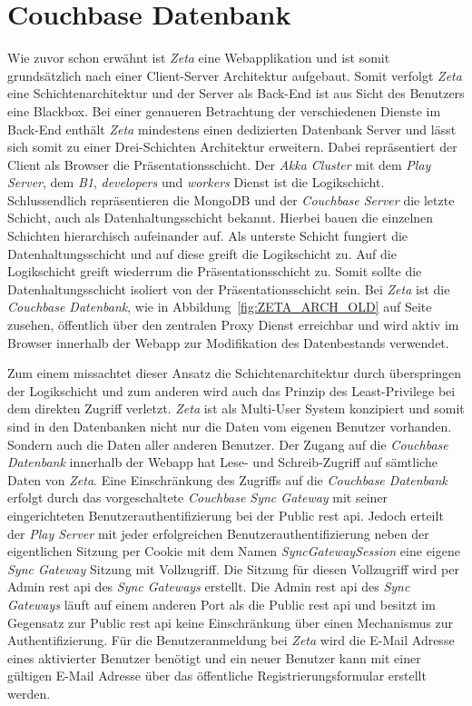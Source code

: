 \section{Couchbase Datenbank}

Wie zuvor schon erwähnt ist \textit{Zeta} eine Webapplikation und ist somit grundsätzlich nach einer Client-Server Architektur aufgebaut. Somit verfolgt \textit{Zeta} eine Schichtenarchitektur und der Server als Back-End ist aus Sicht des Benutzers eine Blackbox. Bei einer genaueren Betrachtung der verschiedenen Dienste im Back-End enthält \textit{Zeta} mindestens einen dedizierten Datenbank Server und lässt sich somit zu einer Drei-Schichten Architektur erweitern. Dabei repräsentiert der Client als Browser die Präsentationsschicht. Der \textit{Akka Cluster} mit dem \textit{Play Server}, dem \textit{B1}, \textit{developers} und \textit{workers} Dienst ist die Logikschicht. Schlussendlich repräsentieren die MongoDB und der \textit{Couchbase Server} die letzte Schicht, auch als Datenhaltungsschicht bekannt. Hierbei bauen die einzelnen Schichten hierarchisch aufeinander auf. Als unterste Schicht fungiert die Datenhaltungsschicht und auf diese greift die Logikschicht zu. Auf die Logikschicht greift wiederrum die Präsentationsschicht zu. Somit sollte die Datenhaltungsschicht isoliert von der Präsentationsschicht sein. Bei \textit{Zeta} ist die \textit{Couchbase Datenbank}, wie in Abbildung~\ref{fig:ZETA_ARCH_OLD} auf Seite~\pageref{fig:ZETA_ARCH_OLD} zusehen, öffentlich über den zentralen Proxy Dienst erreichbar und wird aktiv im Browser innerhalb der Webapp zur Modifikation des Datenbestands verwendet. 

Zum einem missachtet dieser Ansatz die Schichtenarchitektur durch überspringen der Logikschicht und zum anderen wird auch das Prinzip des Least-Privilege bei dem direkten Zugriff verletzt. \textit{Zeta} ist als Multi-User System konzipiert und somit sind in den Datenbanken nicht nur die Daten vom eigenen Benutzer vorhanden. Sondern auch die Daten aller anderen Benutzer. Der Zugang auf die \textit{Couchbase Datenbank} innerhalb der Webapp hat Lese- und Schreib-Zugriff auf sämtliche Daten von \textit{Zeta}. Eine Einschränkung des Zugriffs auf die \textit{Couchbase Datenbank} erfolgt durch das vorgeschaltete \textit{Couchbase Sync Gateway} mit seiner eingerichteten Benutzerauthentifizierung bei der Public \ac{rest} \ac{api}. Jedoch erteilt der \textit{Play Server} mit jeder erfolgreichen Benutzerauthentifizierung neben der eigentlichen Sitzung per Cookie mit dem Namen \textit{SyncGatewaySession} eine eigene \textit{Sync Gateway} Sitzung mit Vollzugriff. Die Sitzung für diesen Vollzugriff wird per Admin \ac{rest} \ac{api} des \textit{Sync Gateways} erstellt. Die Admin \ac{rest} \ac{api} des \textit{Sync Gateways} läuft auf einem anderen Port als die Public \ac{rest} \ac{api} und besitzt im Gegensatz zur Public \ac{rest} \ac{api} keine Einschränkung über einen Mechanismus zur Authentifizierung. Für die Benutzeranmeldung bei \textit{Zeta} wird die E-Mail Adresse eines aktivierter Benutzer benötigt und ein neuer Benutzer kann mit einer gültigen E-Mail Adresse über das öffentliche Registrierungsformular erstellt werden.


